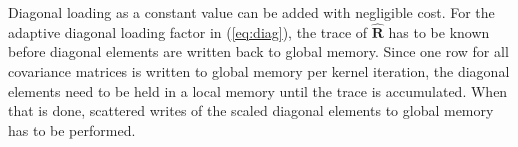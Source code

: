 \documentclass[12pt,journal,onecolumn]{IEEEtran}
\newcommand{\mat}[1]{\mathbf{#1}}
\begin{document}
Diagonal loading as a constant value can be added with negligible cost. For the adaptive diagonal loading factor in (\ref{eq:diag}), the trace of $\mat{\hat{R}}$ has to be known before diagonal elements are written back to global memory. Since one row for all covariance matrices is written to global memory per kernel iteration, the diagonal elements need to be held in a local memory until the trace is accumulated. When that is done, scattered writes of the scaled diagonal elements to global memory has to be performed. 





\end{document}
